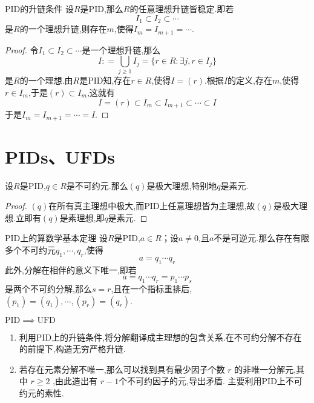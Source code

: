 \documentclass[lang=cn,12pt,color=green,fontset=none,pad]{elegantbook}
\begin{document}
\begin{theorem}{PID的升链条件}
    设$R$是PID,那么$R$的任意理想升链皆稳定.即若 $$ I_{1}\subset I_{2}\subset{\cdots} $$是$R$的一个理想升链,则存在$m$,使得$I_{m}=I_{m+1}={\cdots}$.
\end{theorem}
\begin{proof}
    令$I_{1}\subset I_{2}\subset {\cdots}$是一个理想升链,那么 $$ I: = \bigcup _{j\geqslant  1}I_{j}= \{ r \in R: \exists j,r \in I_{j} \} $$是$R$的一个理想.由$R$是PID知,存在$r \in R$,使得$I= \left( r \right)$.根据$I$的定义,存在$m$,使得$r \in I_{m}$,于是$\left( r \right)\subset I_{m}$,这就有 $$ I=\left( r \right) \subset I_{m}\subset I_{m+1}\subset{\cdots}\subset I $$于是$I_{m}=I_{m+1}={\cdots}= I$.
\end{proof}

\section{PIDs、UFDs}

\begin{proposition}\label{pro:nonzero-ire-prime-in-PID}
    设$R$是PID,$q \in R$是不可约元.那么$\left( q \right)$是极大理想,特别地$q$是素元.
\end{proposition}

\begin{proof}
    $\left( q \right)$在所有真主理想中极大,而PID上任意理想皆为主理想,故$\left( q \right)$是极大理想.立即有$\left( q \right)$是素理想,即$q$是素元.
\end{proof}

\begin{theorem}{PID上的算数学基本定理}\label{thm:PID's FTA}
    设$R$是PID,$a \in R$；设$a \neq0$,且$a$不是可逆元.那么存在有限多个不可约元$q_{1},{\cdots},q_{r}$,使得 $$ a= q_{1}{\cdots}q_{r} $$此外,分解在相伴的意义下唯一,即若 $$ a= q_{1}{\cdots}q_{r}= p_{1}{\cdots}p_{s} $$是两个不可约分解,那么$s=r$,且在一个指标重排后,$\left( p_{1} \right)=\left( q_{1} \right),{\cdots},\left( p_{r} \right)=\left( q_{r} \right)$.
    
\end{theorem}

\begin{remark}
    $ \mathrm{PID} \implies \mathrm{UFD}  $ 
    
\end{remark}

\begin{note}
    \begin{enumerate}[]
        \item 利用PID上的升链条件,将分解翻译成主理想的包含关系.在不可约分解不存在的前提下,构造无穷严格升链.
        \item 若存在元素分解不唯一,那么可以找到具有最少因子个数 $ r $ 的非唯一分解元,其中 $ r \ge 2 $ ,由此造出有 $ r- 1$个不可约因子的元,导出矛盾. 主要利用PID上不可约元的素性.
    \end{enumerate}
    

\end{note}
\end{document}
